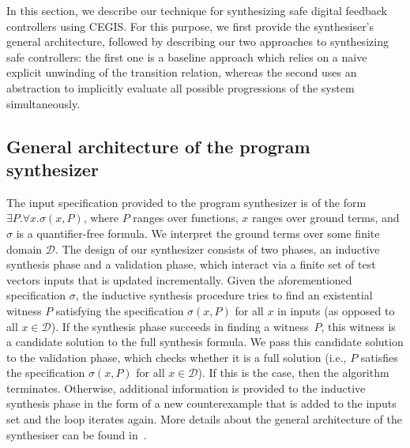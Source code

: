 \documentclass[runningheads,a4paper]{llncs}
\begin{document}
In this section, we describe our technique for synthesizing safe
digital feedback controllers using CEGIS.  For this purpose, we first
provide the synthesiser's general architecture, followed by describing
our two approaches to synthesizing safe controllers:
the first one is a baseline approach which relies on a naive explicit
unwinding of the transition relation, whereas the second uses an
abstraction to implicitly evaluate all possible progressions of the
system simultaneously. %

 
\subsection{General architecture of the program synthesizer}
\label{synthesizer-general}
The input specification provided to the program synthesizer is of the form
$\exists P .  \forall x.  \sigma(x, P)$, 
where $P$ ranges over functions, 
$x$ ranges over ground terms, 
and $\sigma$ is a quantifier-free formula.  
We interpret the ground terms over some finite domain $\mathcal{D}$.
%
The design of our synthesizer consists of two phases, an inductive
synthesis phase and a validation phase, which interact via a finite
set of test vectors {\sc inputs} that is updated incrementally.  Given
the aforementioned specification $\sigma$, the inductive synthesis
procedure tries to find an existential witness $P$ satisfying
the specification $\sigma(x, P)$ for all $x$ in {\sc
  inputs} (as opposed to all $x \in \mathcal{D}$).
%
If the synthesis phase succeeds in finding a witness~$P$, this
witness is a candidate solution to the full synthesis formula.  We
pass this candidate solution to the validation phase, which checks
whether it is a full solution (i.e., $P$ satisfies the
specification $\sigma(x, P)$ for all
$x\in\mathcal{D}$).  If this is the case, then the algorithm
terminates.  Otherwise, additional information is provided to the
inductive synthesis phase in the form of a new counterexample that is
added to the {\sc inputs} set and the loop iterates again.
More details about the general architecture of the synthesiser can
be found in~\cite{DBLP:conf/lpar/DavidKL15}.
\end{document}
